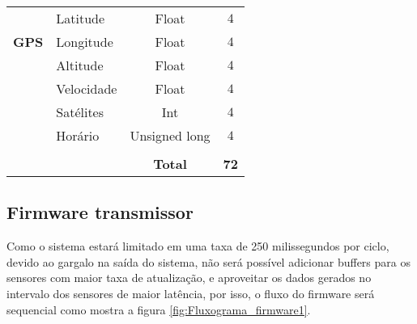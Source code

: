 \begin{table}[!thb]
\begin{tabular}{ll|c|c|}
		\multicolumn{1}{|c|}{\multirow{3}{*}{\textbf{GPS}}} & Latitude & Float & $4$  
		\\ \cline{2-4}
		\multicolumn{1}{|l|}{} & Longitude & Float & $4$ 
		\\ \cline{2-4}
		
	    \multicolumn{1}{|l|}{} & Altitude & Float & $4$ 
		\\ \cline{2-4}
	    \multicolumn{1}{|l|}{} & Velocidade & Float & $4$ 
		\\ \cline{2-4}
		
	    \multicolumn{1}{|l|}{} & Satélites & Int & $4$ 
		\\ \cline{2-4}		
		
	    \multicolumn{1}{|l|}{} & Horário & Unsigned long & $4$ 
		\\ \hline		
		
		\\ \cline{3-4}
		 & \multicolumn{1}{c|}{\textbf{}} & \textbf{Total}   & \textbf{72} 
		\\ \cline{3-4}
	\end{tabular}
	\Ididthis
\end{table}























\subsection{Firmware transmissor}





Como o sistema estará limitado em uma taxa de 250 milissegundos por ciclo, devido ao gargalo na saída do sistema, não será possível adicionar buffers para os sensores com maior taxa de atualização, e aproveitar os dados gerados no intervalo dos sensores de maior latência, por isso, o fluxo do firmware será sequencial como mostra a figura \ref{fig:Fluxograma_firmware1}. 







